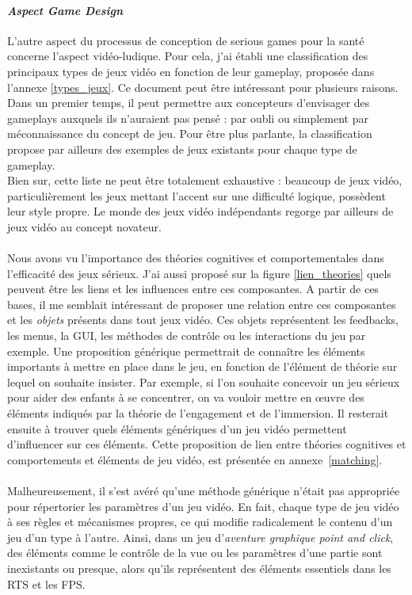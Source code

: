 			\paragraph{\emph{Aspect Game Design}\\}
L'autre aspect du processus de conception de serious games pour la santé concerne l'aspect vidéo-ludique. Pour cela, j'ai établi une classification des principaux types de jeux vidéo en fonction de leur gameplay, proposée dans l'annexe \ref{types_jeux}. Ce document peut être intéressant pour plusieurs raisons. Dans un premier temps, il peut permettre aux concepteurs d'envisager des gameplays auxquels ils n'auraient pas pensé : par oubli ou simplement par méconnaissance du concept de jeu. Pour être plus parlante, la classification propose par ailleurs des exemples de jeux existants pour chaque type de gameplay. \\
Bien sur, cette liste ne peut être totalement exhaustive : beaucoup de jeux vidéo, particulièrement les jeux mettant l'accent sur une difficulté logique, possèdent leur style propre. Le monde des jeux vidéo indépendants regorge par ailleurs de jeux vidéo au concept novateur.

			\paragraph{}
Nous avons vu l'importance des théories cognitives et comportementales dans l'efficacité des jeux sérieux. J'ai aussi proposé sur la figure \ref{lien_theories} quels peuvent être les liens et les influences entre ces composantes. A partir de ces bases, il me semblait intéressant de proposer une relation entre ces composantes et les \emph{objets} présents dans tout jeux vidéo. Ces objets représentent les feedbacks, les menus, la GUI, les méthodes de contrôle ou les interactions du jeu par exemple. Une proposition générique permettrait de connaître les éléments importants à mettre en place dans le jeu, en fonction de l'élément de théorie sur lequel on souhaite insister. Par exemple, si l'on souhaite concevoir un jeu sérieux pour aider des enfants à se concentrer, on va vouloir mettre en œuvre des éléments indiqués par la théorie de l'engagement et de l'immersion. Il resterait ensuite à trouver quels éléments génériques d'un jeu vidéo permettent d'influencer sur ces éléments.
Cette proposition de lien entre théories cognitives et comportements et éléments de jeu vidéo, est présentée en annexe~\ref{matching}.

\paragraph{}Malheureusement, il s'est avéré qu'une méthode générique n'était pas appropriée pour répertorier les paramètres d'un jeu vidéo. En fait, chaque type de jeu vidéo à ses règles et mécanismes propres, ce qui modifie radicalement le contenu d'un jeu d'un type à l'autre. Ainsi, dans un jeu d'\emph{aventure graphique point and click}, des éléments comme le contrôle de la vue ou les paramètres d'une partie sont inexistants ou presque, alors qu'ils représentent des éléments essentiels dans les RTS et les FPS.
